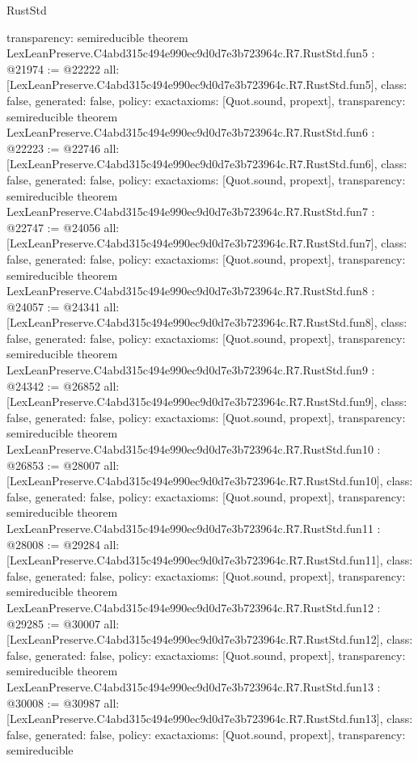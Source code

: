 \begin{lexlean}{RustStd}
\begin{coremodule}
{  transparency: semireducible
}
theorem LexLeanPreserve.C4abd315c494e990ec9d0d7e3b723964c.R7.RustStd.fun5 : @21974 := @22222 {
  all: [LexLeanPreserve.C4abd315c494e990ec9d0d7e3b723964c.R7.RustStd.fun5],
  class: false,
  generated: false,
  policy: exact{axioms: [Quot.sound, propext]},
  transparency: semireducible
}
theorem LexLeanPreserve.C4abd315c494e990ec9d0d7e3b723964c.R7.RustStd.fun6 : @22223 := @22746 {
  all: [LexLeanPreserve.C4abd315c494e990ec9d0d7e3b723964c.R7.RustStd.fun6],
  class: false,
  generated: false,
  policy: exact{axioms: [Quot.sound, propext]},
  transparency: semireducible
}
theorem LexLeanPreserve.C4abd315c494e990ec9d0d7e3b723964c.R7.RustStd.fun7 : @22747 := @24056 {
  all: [LexLeanPreserve.C4abd315c494e990ec9d0d7e3b723964c.R7.RustStd.fun7],
  class: false,
  generated: false,
  policy: exact{axioms: [Quot.sound, propext]},
  transparency: semireducible
}
theorem LexLeanPreserve.C4abd315c494e990ec9d0d7e3b723964c.R7.RustStd.fun8 : @24057 := @24341 {
  all: [LexLeanPreserve.C4abd315c494e990ec9d0d7e3b723964c.R7.RustStd.fun8],
  class: false,
  generated: false,
  policy: exact{axioms: [Quot.sound, propext]},
  transparency: semireducible
}
theorem LexLeanPreserve.C4abd315c494e990ec9d0d7e3b723964c.R7.RustStd.fun9 : @24342 := @26852 {
  all: [LexLeanPreserve.C4abd315c494e990ec9d0d7e3b723964c.R7.RustStd.fun9],
  class: false,
  generated: false,
  policy: exact{axioms: [Quot.sound, propext]},
  transparency: semireducible
}
theorem LexLeanPreserve.C4abd315c494e990ec9d0d7e3b723964c.R7.RustStd.fun10 : @26853 := @28007 {
  all: [LexLeanPreserve.C4abd315c494e990ec9d0d7e3b723964c.R7.RustStd.fun10],
  class: false,
  generated: false,
  policy: exact{axioms: [Quot.sound, propext]},
  transparency: semireducible
}
theorem LexLeanPreserve.C4abd315c494e990ec9d0d7e3b723964c.R7.RustStd.fun11 : @28008 := @29284 {
  all: [LexLeanPreserve.C4abd315c494e990ec9d0d7e3b723964c.R7.RustStd.fun11],
  class: false,
  generated: false,
  policy: exact{axioms: [Quot.sound, propext]},
  transparency: semireducible
}
theorem LexLeanPreserve.C4abd315c494e990ec9d0d7e3b723964c.R7.RustStd.fun12 : @29285 := @30007 {
  all: [LexLeanPreserve.C4abd315c494e990ec9d0d7e3b723964c.R7.RustStd.fun12],
  class: false,
  generated: false,
  policy: exact{axioms: [Quot.sound, propext]},
  transparency: semireducible
}
theorem LexLeanPreserve.C4abd315c494e990ec9d0d7e3b723964c.R7.RustStd.fun13 : @30008 := @30987 {
  all: [LexLeanPreserve.C4abd315c494e990ec9d0d7e3b723964c.R7.RustStd.fun13],
  class: false,
  generated: false,
  policy: exact{axioms: [Quot.sound, propext]},
  transparency: semireducible
}
\end{coremodule}
\end{lexlean}
